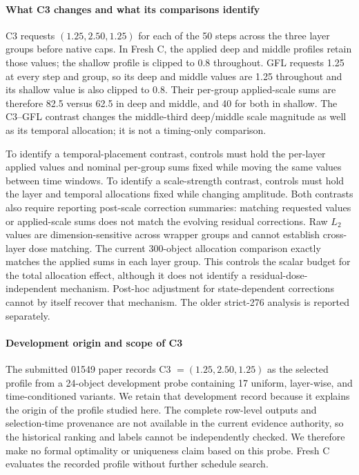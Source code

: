 \documentclass[times,twocolumn,final]{elsarticle}
\begin{document}
\paragraph{What C3 changes and what its comparisons identify}
C3 requests $(1.25,2.50,1.25)$ for each of the 50 steps across the three layer groups before native caps. In Fresh C, the applied deep and middle profiles retain those values; the shallow profile is clipped to 0.8 throughout. GFL requests 1.25 at every step and group, so its deep and middle values are 1.25 throughout and its shallow value is also clipped to 0.8. Their per-group applied-scale sums are therefore 82.5 versus 62.5 in deep and middle, and 40 for both in shallow. The C3--GFL contrast changes the middle-third deep/middle scale magnitude as well as its temporal allocation; it is not a timing-only comparison.

To identify a temporal-placement contrast, controls must hold the per-layer applied values and nominal per-group sums fixed while moving the same values between time windows. To identify a scale-strength contrast, controls must hold the layer and temporal allocations fixed while changing amplitude. Both contrasts also require reporting post-scale correction summaries: matching requested values or applied-scale sums does not match the evolving residual corrections. Raw $L_2$ values are dimension-sensitive across wrapper groups and cannot establish cross-layer dose matching. The current 300-object allocation comparison exactly matches the applied sums in each layer group. This controls the scalar budget for the total allocation effect, although it does not identify a residual-dose-independent mechanism. Post-hoc adjustment for state-dependent corrections cannot by itself recover that mechanism. The older strict-276 analysis is reported separately.

\paragraph{Development origin and scope of C3}
The submitted 01549 paper records C3 $=(1.25,2.50,1.25)$ as the selected profile from a 24-object development probe containing 17 uniform, layer-wise, and time-conditioned variants. We retain that development record because it explains the origin of the profile studied here. The complete row-level outputs and selection-time provenance are not available in the current evidence authority, so the historical ranking and labels cannot be independently checked. We therefore make no formal optimality or uniqueness claim based on this probe. Fresh C evaluates the recorded profile without further schedule search.
\end{document}
